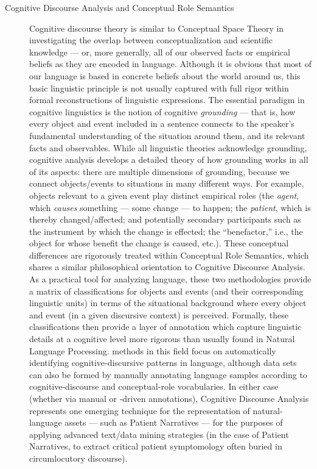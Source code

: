 \documentclass[11pt,letterpaper]{article}
\newcommand{\AI}{\resizebox{!}{7.5pt}{\AcronymText{AI}}}
\newcommand{\lAI}{\resizebox{!}{8pt}{\AcronymText{AI}}}
\newcommand{\textscc}[1]{{\color{orr!35!black}{{%
						\fontfamily{Cabin-TLF}\fontseries{b}\selectfont{\textsc{\scriptsize{#1}}}}}}}
\newcommand{\AcronymText}[1]{{\textscc{#1}}}
\newcommand{\q}[1]{{\fontfamily{qcr}\selectfont ``}#1{\fontfamily{qcr}\selectfont ''}}
\begin{document}
{{\begin{description}
\item[Cognitive Discourse Analysis and 
Conceptual Role Semantics]  Cognitive discourse 
theory is similar to Conceptual Space Theory in 
investigating the overlap between conceptualization 
and scientific knowledge --- or, more generally, 
all of our observed facts or empirical beliefs 
as they are encoded in language.  Although it is 
obvious that most of our language is based in 
concrete beliefs about the world around us, this 
basic linguistic principle is not usually 
captured with full rigor within formal reconstructions 
of linguistic expressions.  The essential paradigm 
in cognitive linguistics is the notion of 
cognitive \textit{grounding} --- that is, how every 
object and event included in a sentence 
connects to the speaker's fundamental understanding 
of the situation around them, and its relevant 
facts and observables.  While all linguistic theories 
acknowledge grounding, cognitive analysis 
develops a detailed theory of how grounding works in 
all of its aspects: there are multiple dimensions of 
grounding, because we connect objects/events 
to situations in many different ways.  For example, 
objects relevant to a given event play distinct 
empirical roles (the \textit{agent}, which 
\textit{causes} something --- some change --- to happen; 
the \textit{patient}, which is thereby changed/affected; 
and potentially secondary participants such as the 
instrument by which the change is effected; the 
\q{benefactor,} i.e., the object for whose benefit 
the change is caused, etc.).  These conceptual differences 
are rigorously treated within Conceptual Role Semantics, 
which shares a similar philosophical orientation to 
Cognitive Discourse Analysis.  As a practical tool 
for analyzing language, these two methodologies 
provide a matrix of classifications for objects 
and events (and their corresponding linguistic 
units) in terms of the situational background 
where every object and event (in a given discursive 
context) is perceived.  Formally, these classifications 
then provide a layer of annotation which capture 
linguistic details at a cognitive level more rigorous 
than usually found in Natural Language Processing.  
\lAI{} methods in this field focus on automatically 
identifying cognitive-discursive patterns in language, 
although data sets can also be formed by manually 
annotating language samples according to 
cognitive-discourse and conceptual-role vocabularies.  
In either case (whether via manual or \AI{}-driven 
annotations), Cognitive Discourse Analysis represents 
one emerging technique for the representation 
of natural-language assets --- such as Patient Narratives 
--- for the purposes of applying advanced text/data mining 
strategies (in the case of Patient Narratives, 
to extract critical patient symptomology often 
buried in circumlocutory discourse). 
\end{description} 
}


}
\end{document}
